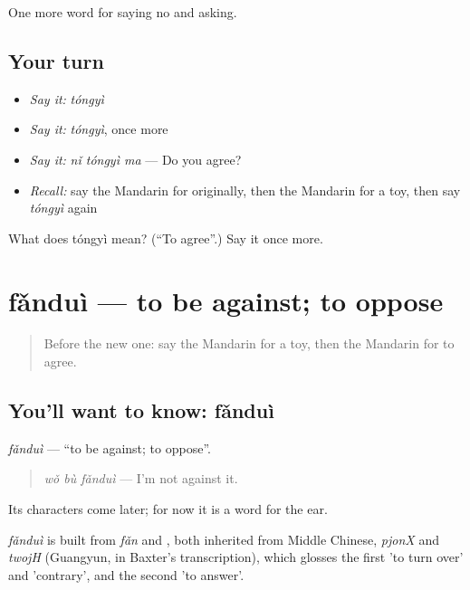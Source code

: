 \begin{grammarlens}[title={What you've built}]
One more word for saying no and asking.
\end{grammarlens}

\subsection*{Your turn}
\begin{itemize}
\raggedright
  \item \emph{Say it:} \emph{tóngyì}
  \item \emph{Say it:} \emph{tóngyì}, once more
  \item \emph{Say it:} \emph{nǐ tóngyì ma} — Do you agree?
  \item \emph{Recall:} say the Mandarin for originally, then the Mandarin for a toy, then say \emph{tóngyì} again
\end{itemize}

\begin{tcolorbox}[breakable,colback=teal!4,colframe=teal!35!black,title={Before you move on}]
What does tóngyì mean? (\textquotedblleft{}To agree\textquotedblright{}.) Say it once more.
\end{tcolorbox}
\section[fǎnduì]{fǎnduì — to be against; to oppose}

\label{lesson:ZH-C270-fandui}



\begin{quote}
Before the new one: say the Mandarin for a toy, then the Mandarin for to agree.
\end{quote}

\subsection*{You'll want to know: fǎnduì}
\emph{fǎnduì} — \textquotedblleft{}to be against; to oppose\textquotedblright{}.

\begin{quote}
\emph{wǒ bù fǎnduì} — I'm not against it.
\end{quote}

Its characters come later; for now it is a word for the ear.

\begin{cousinweb}
\emph{fǎnduì} is built from \emph{fǎn} and , both inherited from Middle Chinese, \emph{pjonX} and \emph{twojH} (Guangyun, in Baxter's transcription), which glosses the first 'to turn over' and 'contrary', and the second 'to answer'.
\end{cousinweb}

